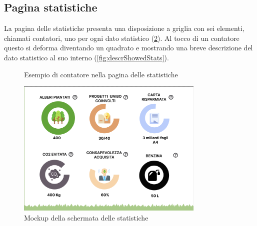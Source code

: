 \subsection{Pagina statistiche}
La pagina delle statistiche presenta una disposizione a griglia con sei elementi, chiamati contatori, uno per ogni dato statistico (\ref{fig:statsPage}). Al tocco di un contatore questo si deforma diventando un quadrato e mostrando una breve descrizione del dato statistico al suo interno (\ref{fig:descrShowedStats}).

\begin{figure} [h]
    \centering
    \caption{Esempio di contatore nella pagina delle statistiche}
    \label{fig:statCircle}
\end{figure}

\begin{figure}
    \centering
    \includegraphics[width=0.8\textwidth]{img/statsPage.png}
    \caption{Mockup della schermata delle statistiche}
    \label{fig:statsPage}
\end{figure}
%
%
